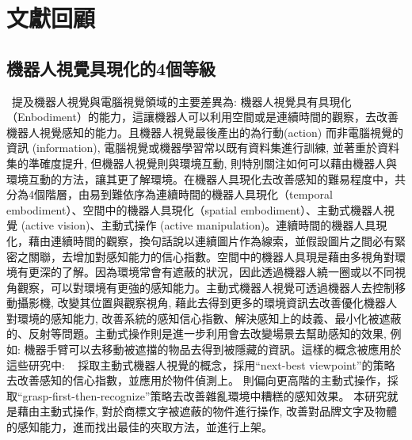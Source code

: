 \chapter{文獻回顧}
\label{chapter:relate-work}

\section{機器人視覺具現化的4個等級}
~\cite{sunderhauf2018limits}提及機器人視覺與電腦視覺領域的主要差異為: 機器人視覺具有具現化（Enbodiment）的能力，這讓機器人可以利用空間或是連續時間的觀察，去改善機器人視覺感知的能力。且機器人視覺最後產出的為行動(action) 而非電腦視覺的資訊 (information), 電腦視覺或機器學習常以既有資料集進行訓練, 並著重於資料集的準確度提升, 但機器人視覺則與環境互動, 則特別關注如何可以藉由機器人與環境互動的方法，讓其更了解環境。在機器人具現化去改善感知的難易程度中，共分為4個階層，由易到難依序為連續時間的機器人具現化（temporal embodiment）、空間中的機器人具現化（spatial embodiment）、主動式機器人視覺 (active vision)、主動式操作 (active manipulation)。連續時間的機器人具現化，藉由連續時間的觀察，換句話說以連續圖片作為線索，並假設圖片之間必有緊密之關聯，去增加對感知能力的信心指數。空間中的機器人具現是藉由多視角對環境有更深的了解。因為環境常會有遮蔽的狀況，因此透過機器人繞一圈或以不同視角觀察，可以對環境有更強的感知能力。主動式機器人視覺可透過機器人去控制移動攝影機, 改變其位置與觀察視角, 藉此去得到更多的環境資訊去改善優化機器人對環境的感知能力, 改善系統的感知信心指數、解決感知上的歧義、最小化被遮蔽的、反射等問題。主動式操作則是進一步利用會去改變場景去幫助感知的效果, 例如: 機器手臂可以去移動被遮擋的物品去得到被隱藏的資訊。這樣的概念被應用於這些研究中: ~\cite{atanasov2014nonmyopic} \cite{doumanoglou2016recovering} \cite{malmir2017deep}採取主動式機器人視覺的概念，採用``next-best viewpoint''的策略去改善感知的信心指數，並應用於物件偵測上。
 \cite{zeng2018robotic} 則偏向更高階的主動式操作，採取``grasp-first-then-recognize''策略去改善雜亂環境中糟糕的感知效果。
本研究就是藉由主動式操作, 對於商標文字被遮蔽的物件進行操作, 改善對品牌文字及物體的感知能力，進而找出最佳的夾取方法，並進行上架。

